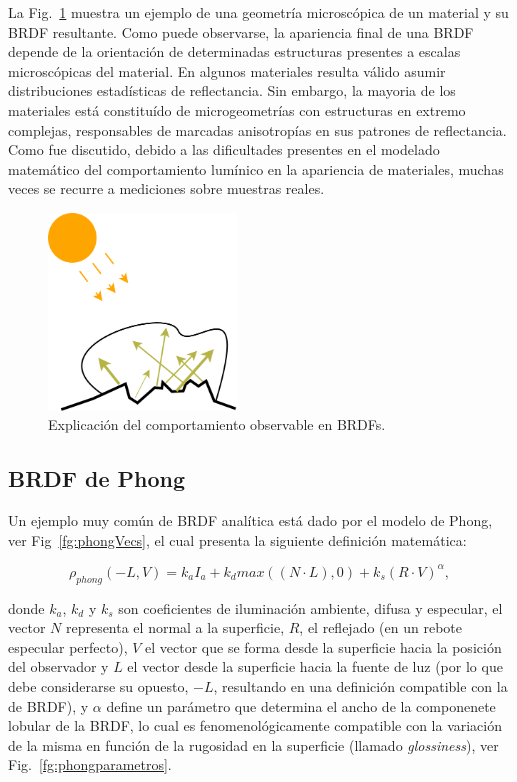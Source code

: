 La Fig.~\ref{fg:microestructura} muestra un ejemplo de una geometría microscópica de un material y su BRDF resultante.
Como puede observarse, la apariencia final de una BRDF depende de la orientación de determinadas estructuras presentes a escalas microscópicas del material.
En algunos materiales resulta válido asumir distribuciones estadísticas de reflectancia.
Sin embargo, la mayoria de los materiales está constituído de microgeometrías con estructuras en extremo complejas, responsables de marcadas anisotropías en sus patrones de reflectancia.
Como fue discutido, debido a las dificultades presentes en el modelado matemático del comportamiento lumínico en la apariencia de materiales, muchas veces se recurre a mediciones sobre muestras reales.


\begin{figure}
\center
\includegraphics[width=5cm]{figures/microestructura}
\caption{Explicación del comportamiento observable en BRDFs.}
\label{fg:microestructura}
\end{figure}


\subsection{BRDF de Phong}
Un ejemplo muy común de BRDF analítica está dado por el modelo de Phong, ver Fig~\ref{fg:phongVecs}, el cual presenta la siguiente definición matemática:

$$\rho_{phong}(-L,V) =  k_{a} I_{a} + k_{d} max((N \cdot L),0) + k_{s} (R \cdot V)^{\alpha},$$

\noindent donde $k_{a}$, $k_{d}$ y $k_{s}$ son coeficientes de iluminación ambiente, difusa y especular, el vector $N$ representa el normal a la superficie, $R$, el reflejado (en un rebote especular perfecto), $V$ el vector que se forma desde la superficie hacia la posición del observador y $L$ el vector desde la superficie hacia la fuente de luz (por lo que debe considerarse su opuesto, $-L$, resultando en una definición compatible con la de BRDF), y $\alpha$ define un parámetro que determina el ancho de la componenete lobular de la BRDF, lo cual es fenomenológicamente compatible con la variación de la misma en función de la rugosidad en la superficie (llamado {\em glossiness}), ver Fig.~\ref{fg:phongparametros}.


